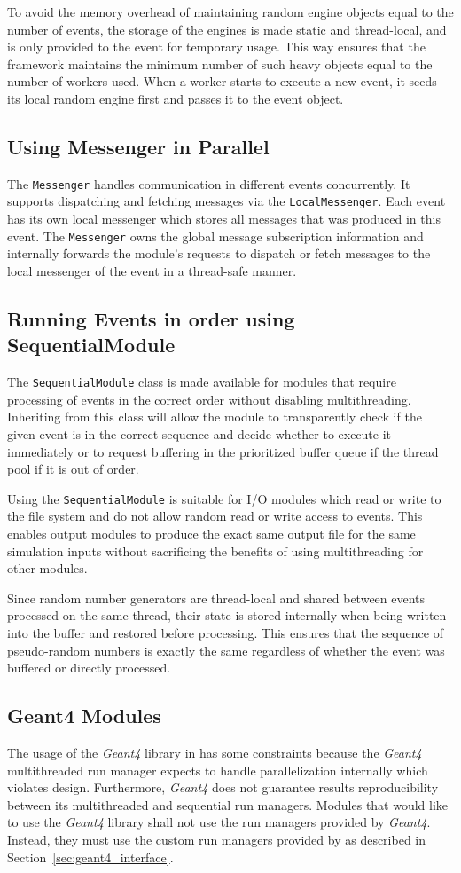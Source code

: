 To avoid the memory overhead of maintaining random engine objects equal to the number of events, the storage of the engines is made static and thread-local, and is only provided to the event for temporary usage.
This way ensures that the framework maintains the minimum number of such heavy objects equal to the number of workers used.
When a worker starts to execute a new event, it seeds its local random engine first and passes it to the event object.

\subsection{Using Messenger in Parallel}
The \texttt{Messenger} handles communication in different events concurrently. It supports dispatching and fetching messages via the \texttt{LocalMessenger}.
Each event has its own local messenger which stores all messages that was produced in this event.
The \texttt{Messenger} owns the global message subscription information and internally forwards the module's requests to dispatch or fetch messages to the local messenger of the event in a thread-safe manner.

\subsection{Running Events in order using SequentialModule}
The \texttt{SequentialModule} class is made available for modules that require processing of events in the correct order without disabling multithreading.
Inheriting from this class will allow the module to transparently check if the given event is in the correct sequence and decide whether to execute it immediately or to request buffering in the prioritized buffer queue if the thread pool if it is out of order.

Using the \texttt{SequentialModule} is suitable for I/O modules which read or write to the file system and do not allow random read or write access to events.
This enables output modules to produce the exact same output file for the same simulation inputs without sacrificing the benefits of using multithreading for other modules.

Since random number generators are thread-local and shared between events processed on the same thread, their state is stored internally when being written into the buffer and restored before processing.
This ensures that the sequence of pseudo-random numbers is exactly the same regardless of whether the event was buffered or directly processed.

\subsection{Geant4 Modules}
The usage of the \emph{Geant4} library in \apsq has some constraints because the \emph{Geant4} multithreaded run manager expects to handle parallelization internally which violates \apsq design.
Furthermore, \emph{Geant4} does not guarantee results reproducibility between its multithreaded and sequential run managers.
Modules that would like to use the \emph{Geant4} library shall not use the run managers provided by \emph{Geant4}.
Instead, they must use the custom run managers provided by \apsq as described in Section~\ref{sec:geant4_interface}.
